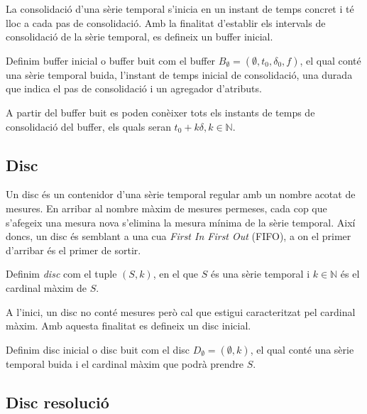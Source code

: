 La consolidació d'una sèrie temporal s'inicia en un instant de temps concret i té lloc a cada pas de consolidació. Amb la finalitat d'establir els intervals de consolidació de la sèrie temporal, es defineix un buffer inicial.

\begin{definition}\label{def:model:buffer_buit}
  Definim buffer inicial o buffer buit com el buffer $B_{\emptyset} =
  (\emptyset,t_0, \delta_0, f)$, el qual
  conté una sèrie temporal buida, l'instant de temps inicial de
  consolidació, una durada que indica el pas de consolidació i un
  agregador d'atributs.
\end{definition}

A partir del buffer buit es poden conèixer tots els instants de temps de consolidació del buffer, els quals seran $t_0+k\delta, k\in\mathbb{N}$. 



\subsection{Disc}\label{sec:model:disc}

Un disc és un contenidor d'una sèrie temporal regular amb un nombre acotat de mesures. En arribar al nombre màxim de mesures permeses, cada cop que s'afegeix una mesura nova s'elimina la mesura mínima de la sèrie temporal.
Així doncs, un disc és semblant a una cua \emph{First In First Out} (FIFO), a on el primer d'arribar és el primer de sortir.  

\begin{definition}[Disc]
  Definim \emph{disc} com el tuple $(S,k)$, en el que $S$
  és una sèrie temporal i $k\in\mathbb{N}$ és el cardinal màxim de $S$.
\end{definition}

A l'inici, un disc no conté mesures però cal que estigui caracteritzat pel cardinal màxim. Amb aquesta finalitat es defineix un disc inicial.

\begin{definition}\label{def:model:disc_buit}
  Definim disc inicial o disc buit com el disc $D_{\emptyset} =
  (\emptyset,k)$, el qual conté una sèrie temporal buida i el cardinal
  màxim que podrà prendre $S$.
\end{definition}




\subsection{Disc resolució}\label{sec:model:disc_multiresolucio}

